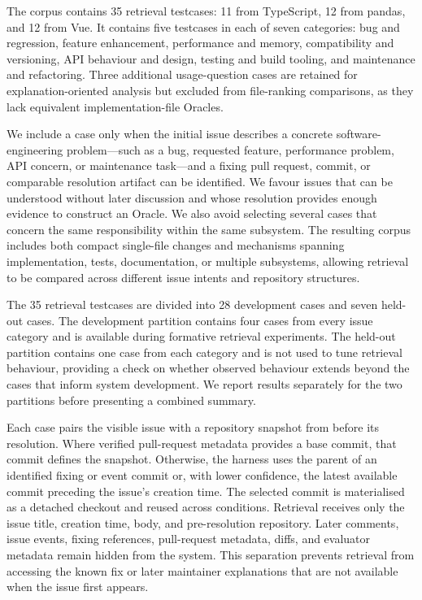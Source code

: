 The corpus contains 35 retrieval testcases: 11 from TypeScript, 12 from pandas, and 12 from Vue. It contains five testcases in each of seven categories: bug and regression, feature enhancement, performance and memory, compatibility and versioning, API behaviour and design, testing and build tooling, and maintenance and refactoring. Three additional usage-question cases are retained for explanation-oriented analysis but excluded from file-ranking comparisons, as they lack equivalent implementation-file Oracles.

We include a case only when the initial issue describes a concrete software-engineering problem---such as a bug, requested feature, performance problem, API concern, or maintenance task---and a fixing pull request, commit, or comparable resolution artifact can be identified. We favour issues that can be understood without later discussion and whose resolution provides enough evidence to construct an Oracle. We also avoid selecting several cases that concern the same responsibility within the same subsystem. The resulting corpus includes both compact single-file changes and mechanisms spanning implementation, tests, documentation, or multiple subsystems, allowing retrieval to be compared across different issue intents and repository structures.

The 35 retrieval testcases are divided into 28 development cases and seven held-out cases. The development partition contains four cases from every issue category and is available during formative retrieval experiments. The held-out partition contains one case from each category and is not used to tune retrieval behaviour, providing a check on whether observed behaviour extends beyond the cases that inform system development. We report results separately for the two partitions before presenting a combined summary.

Each case pairs the visible issue with a repository snapshot from before its resolution. Where verified pull-request metadata provides a base commit, that commit defines the snapshot. Otherwise, the harness uses the parent of an identified fixing or event commit or, with lower confidence, the latest available commit preceding the issue's creation time. The selected commit is materialised as a detached checkout and reused across conditions. Retrieval receives only the issue title, creation time, body, and pre-resolution repository. Later comments, issue events, fixing references, pull-request metadata, diffs, and evaluator metadata remain hidden from the system. This separation prevents retrieval from accessing the known fix or later maintainer explanations that are not available when the issue first appears.

